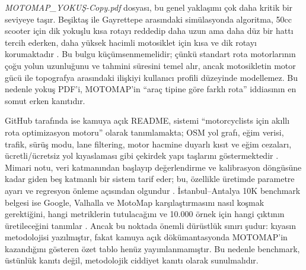 \documentclass[11pt,a4paper]{article}
\begin{document}
\emph{MOTOMAP\_YOKUŞ-Copy.pdf} dosyası, bu genel yaklaşımı çok daha kritik bir seviyeye taşır. Beşiktaş ile Gayrettepe arasındaki simülasyonda algoritma, 50cc scooter için dik yokuşlu kısa rotayı reddedip daha uzun ama daha düz bir hattı tercih ederken, daha yüksek hacimli motosiklet için kısa ve dik rotayı korumaktadır \cite{u2}. Bu bulgu küçümsenmemelidir; çünkü standart rota motorlarının çoğu yolun uzunluğunu ve tahmini süresini temel alır, ancak motosikletin motor gücü ile topografya arasındaki ilişkiyi kullanıcı profili düzeyinde modellemez. Bu nedenle yokuş PDF'i, MOTOMAP'in ``araç tipine göre farklı rota'' iddiasının en somut erken kanıtıdır.

GitHub tarafında ise kamuya açık README, sistemi ``motorcyclists için akıllı rota optimizasyon motoru'' olarak tanımlamakta; OSM yol grafı, eğim verisi, trafik, sürüş modu, lane filtering, motor hacmine duyarlı kısıt ve eğim cezaları, ücretli/ücretsiz yol kıyaslaması gibi çekirdek yapı taşlarını göstermektedir \cite{g1}. Mimari notu, veri katmanından başlayıp değerlendirme ve kalibrasyon döngüsüne kadar giden beş katmanlı bir sistem tarif eder; bu, özellikle üretimde parametre ayarı ve regresyon önleme açısından olgundur \cite{g2}. İstanbul--Antalya 10K benchmark belgesi ise Google, Valhalla ve MotoMap karşılaştırmasını nasıl koşmak gerektiğini, hangi metriklerin tutulacağını ve 10.000 örnek için hangi çıktının üretileceğini tanımlar \cite{g3}. Ancak bu noktada önemli dürüstlük sınırı şudur: kıyasın metodolojisi yazılmıştır, fakat kamuya açık dökümantasyonda MOTOMAP'in kazandığını gösteren özet tablo henüz yayımlanmamıştır. Bu nedenle benchmark, üstünlük kanıtı değil, metodolojik ciddiyet kanıtı olarak sunulmalıdır.
\end{document}
